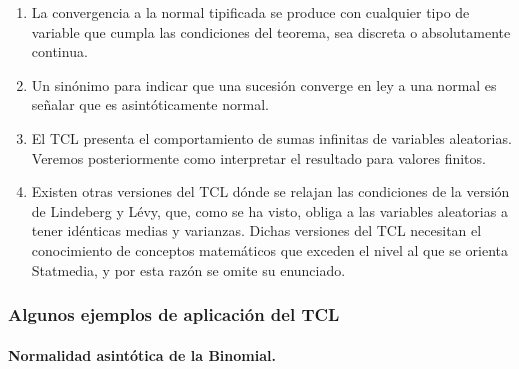 \documentclass[
]{article}
\providecommand{\tightlist}{%
  \setlength{\itemsep}{0pt}\setlength{\parskip}{0pt}}
\begin{document}
\begin{enumerate}
\def\labelenumi{\arabic{enumi}.}
\tightlist
\item
  La convergencia a la normal tipificada se produce con cualquier tipo de variable que cumpla las condiciones del teorema, sea discreta o absolutamente continua.
\item
  Un sinónimo para indicar que una sucesión converge en ley a una normal es señalar que es asintóticamente normal.
\item
  El TCL presenta el comportamiento de sumas infinitas de variables aleatorias. Veremos posteriormente como interpretar el resultado para valores finitos.
\item
  Existen otras versiones del TCL dónde se relajan las condiciones de la versión de Lindeberg y Lévy, que, como se ha visto, obliga a las variables aleatorias a tener idénticas medias y varianzas. Dichas versiones del TCL necesitan el conocimiento de conceptos matemáticos que exceden el nivel al que se orienta Statmedia, y por esta razón se omite su enunciado.
\end{enumerate}

\subsubsection{Algunos ejemplos de aplicación del TCL}\label{algunos-ejemplos-de-aplicaciuxf3n-del-tcl}

\paragraph{Normalidad asintótica de la Binomial.}\label{normalidad-asintuxf3tica-de-la-binomial.}
\end{document}

